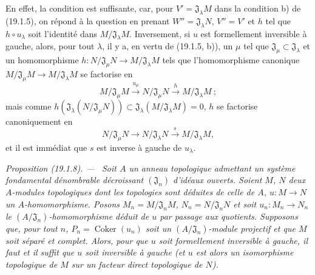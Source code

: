 \documentclass[10pt,oneside]{book}
\makeatletter
\newcommand{\setmanualcurrentlabel}[1]{\def\@currentlabel{#1}}
\newcommand{\oldpage}[2][]{%
  \setcounter{footnote}{0}%
  \marginpar{\scriptsize\textbf{#1}~|~#2}\ignorespaces}
\newenvironment{proposition}[1][]{%
  \setmanualcurrentlabel{#1}\par\medskip\noindent\itshape Proposition (#1). ---\ }{\par}
\makeatother
\begin{document}
En effet, la condition est suffisante, car, pour
$V'=\mathfrak J_\lambda M$ dans la condition b) de (19.1.5), on répond à la
question en prenant $W''=\mathfrak J_\lambda N$, $V''=V'$ et $h$ tel que
$h\circ u_\lambda$ soit l'identité dans $M/\mathfrak J_\lambda M$.
Inversement, si $u$ est formellement inversible à gauche, alors, pour tout
$\lambda$, il y a, en vertu de (19.1.5, b)), un $\mu$ tel que
$\mathfrak J_\mu\subset\mathfrak J_\lambda$ et un homomorphisme
$h:N/\mathfrak J_\mu N\to M/\mathfrak J_\lambda M$ tels que l'homomorphisme
canonique $M/\mathfrak J_\mu M\to M/\mathfrak J_\lambda M$ se factorise en
\[
  M/\mathfrak J_\mu M\xrightarrow{u_\mu}N/\mathfrak J_\mu N
  \xrightarrow{h}M/\mathfrak J_\lambda M~;
\]
mais comme
$h(\mathfrak J_\lambda(N/\mathfrak J_\mu N))
\subset\mathfrak J_\lambda(M/\mathfrak J_\lambda M)=0$, $h$ se factorise
canoniquement en
\[
  N/\mathfrak J_\mu N\longrightarrow N/\mathfrak J_\lambda N
  \xrightarrow{s}M/\mathfrak J_\lambda M,
\]
et il est immédiat que $s$ est inverse à gauche de $u_\lambda$.

\begin{proposition}[19.1.8]
\label{0.19.1.8-fr}
Soit $A$ un anneau topologique admettant un système fondamental dénombrable
décroissant $(\mathfrak J_n)$ d'idéaux ouverts. Soient $M$, $N$ deux
$A$-modules topologiques dont les topologies sont déduites de celle de $A$,
$u:M\to N$ un $A$-homomorphisme. Posons
$M_n=M/\mathfrak J_nM$, $N_n=N/\mathfrak J_nN$ et soit
$u_n:M_n\to N_n$ le $(A/\mathfrak J_n)$-homomorphisme déduit de $u$ par
passage aux quotients. Supposons que, pour tout $n$,
$P_n=\operatorname{Coker}(u_n)$ soit un $(A/\mathfrak J_n)$-module projectif
et que $M$ soit séparé et complet. Alors, pour que $u$ soit formellement
inversible à gauche, il faut et il suffit que $u$ soit inversible à gauche (et
$u$ est alors un isomorphisme topologique de $M$ sur un facteur direct
topologique de $N$).
\end{proposition}

\oldpage[0\textsubscript{IV-1}]{74}
\end{document}
